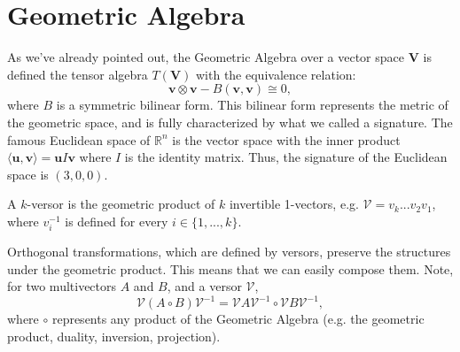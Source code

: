\section{Geometric Algebra}

As we've already pointed out, the Geometric Algebra
over a vector space $\mathbf V$ is defined the tensor
algebra $T(\mathbf V)$ with the equivalence relation:
\begin{displaymath}
	\mathbf{v} \otimes \mathbf{v} - B(\mathbf v, \mathbf v) \cong 0,
\end{displaymath}
where $B$ is a symmetric bilinear form.
This bilinear form represents the metric of the geometric space,
and is fully characterized by what we called a signature.
The famous Euclidean space of $\mathbb R^n$ is the vector
space with the inner product
$\langle \mathbf u, \mathbf v \rangle = \mathbf u I \mathbf v$
where $I$ is the identity matrix.
Thus, the signature of the Euclidean space is $(3,0,0)$.


\begin{definition}[Versor]
	A $k$-versor is the geometric product of $k$ invertible
	1-vectors, e.g. $\mathcal V = v_k ... v_2 v_1$, where
	$v^{-1}_i$ is defined for every $i \in \{1,...,k\}$.
\end{definition}

\begin{note}
	Orthogonal transformations, which are defined by versors,
	preserve the structures under the geometric product.
	This means that we can easily compose them.
	Note, for two multivectors $A$ and $B$, and a versor $\mathcal V$,
	\begin{displaymath}
		\mathcal V(A \circ B) \mathcal V^{-1} =
		\mathcal V A \mathcal V^{-1} \circ
		\mathcal V B \mathcal V^{-1},
	\end{displaymath}
	where $\circ$ represents any product of the Geometric Algebra
	(e.g. the geometric product, duality, inversion, projection).

\end{note}
